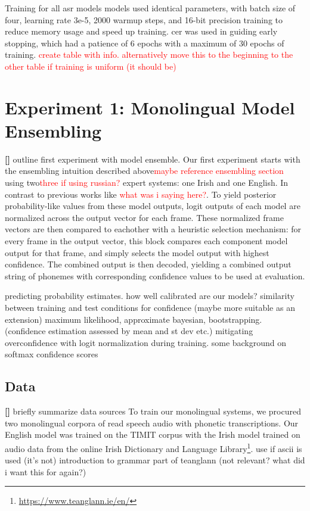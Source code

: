 \documentclass[thesis]{cluu}
\newcounter{paranum}
\newcommand{\numberedparagraph}{\par\refstepcounter{paranum}\textbf{[\theparanum] }}
\newcommand{\todo}[1]{\textcolor{red}{#1}}
\begin{document}
Training for all \gls{asr} models models used identical parameters, with batch size of four, learning rate 3e-5, 2000 warmup steps, and 16-bit precision training to reduce memory usage and speed up training. \gls{cer} was used in guiding early stopping, which had a patience of 6 epochs with a maximum of 30 epochs of training. \todo{create table with info. alternatively move this to the beginning to the other table if training is uniform (it should be)}

\section{Experiment 1: Monolingual Model Ensembling} \label{ex:1}
\numberedparagraph{outline first experiment with model ensemble.}
Our first experiment starts with the ensembling intuition described above\todo{maybe reference ensembling section} using two\todo{three if using russian?} expert systems: one Irish and one English. In contrast to previous works like \textcite{dengEnsembleDeepLearning2014}\todo{what was i saying here?}. To yield posterior probability-like values from these model outputs, logit outputs of each model are normalized across the output vector for each frame. These normalized frame vectors are then compared to eachother with a heuristic selection mechanism: for every frame in the output vector, this block compares each component model output for that frame, and simply selects the model output with highest confidence. The combined output is then decoded, yielding a combined output string of phonemes with corresponding confidence values to be used at evaluation.

\textcite{guoCalibrationModernNeural2017} predicting probability estimates. how well calibrated are our models?
\textcite{niehuesModelingConfidenceSequencetoSequence2019} similarity between training and test conditions for confidence (maybe more suitable as an extension)
\textcite{papadopoulosConfidenceEstimationMethods2001} maximum likelihood, approximate bayesian, bootstrapping. (confidence estimation assessed by mean and st dev etc.)
\textcite{weiMitigatingNeuralNetwork2022} mitigating overconfidence with logit normalization during training. some background on softmax confidence scores

\subsection{Data}
\numberedparagraph{briefly summarize data sources}
To train our monolingual systems, we procured two monolingual corpora of read speech audio with phonetic transcriptions. Our English model was trained on the TIMIT corpus \textcite{garofoloDARPATIMITAcousticphonetic1993} with the Irish model trained on audio data from the online Irish Dictionary and Language Library\footnote{\url{https://www.teanglann.ie/en/}}. 
\textcite{krishenbaumRepresentingIPAPhonetics} use if ascii is used (it's not)
\textcite{mechuraIntroductionGramadanIrish} introduction to grammar part of teanglann (not relevant? what did i want this for again?)
\end{document}
